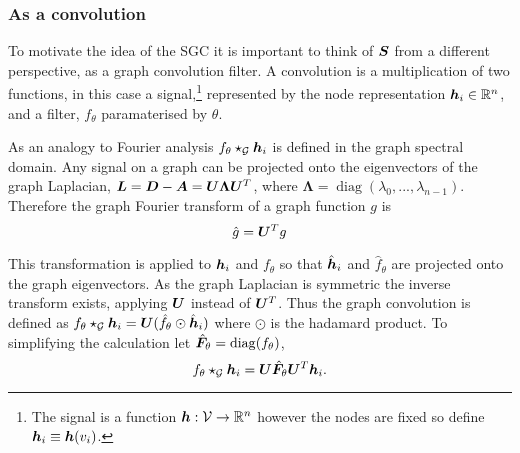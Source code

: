 \subsubsection{As a convolution}
\label{sec:conv}

To motivate the idea of the SGC it is important to think of ${\bm{S}}$ from a different perspective, as a graph convolution filter. A convolution is a multiplication of two functions, in this case a signal,\footnote{The signal is a function ${\bm{h}} : {\mathcal{V}} \to \mathbb{R}^n$ however the nodes are fixed so define ${\bm{h}}_i \equiv {\bm{h}}(v_i)$.}
represented by the node representation ${\bm{h}}_i \in \mathbb{R}^n$, and a filter, $f_\theta$ paramaterised by $\theta$.

As an analogy to Fourier analysis $f_\theta \star_{\mathcal{G}} {\bm{h}}_i$ is defined in the graph spectral domain.
Any signal on a graph can be projected onto the eigenvectors of the graph Laplacian, ${\bm{L}} = {\bm{D}} - {\bm{A}} = {\bm{U}}\bm{\Lambda}{\bm{U}}^T$, where $\bm{\Lambda} = \operatorname{diag}(\lambda_0, ..., \lambda_{n-1})$.
Therefore the graph Fourier transform of a graph function $g$ is
\begin{equation}
    \hat{g} = {\bm{U}}^Tg
\end{equation}

%


This transformation is applied to ${\bm{h}}_i$ and $f_\theta$ so that $\hat{{\bm{h}}}_i$ and $\hat f_\theta$ are projected onto the graph eigenvectors.
As the graph Laplacian is symmetric the inverse transform exists, applying ${\bm{U}}$ instead of ${\bm{U}}^T$.
Thus the graph convolution is defined as $f_\theta \star_{\mathcal{G}} {\bm{h}}_i = {\bm{U}}(\hat f_\theta \odot \hat{{\bm{h}}}_i)$ where $\odot$ is the hadamard product.
To simplifying the calculation let $\hat{{\bm{F}}}_\theta = \operatorname{diag}(f_\theta)$,
\begin{equation}
    \label{eq:conv}
    f_\theta \star_{\mathcal{G}} {\bm{h}}_i = {\bm{U}}\hat{{\bm{F}}}_\theta{\bm{U}}^T{\bm{h}}_i.
\end{equation}

